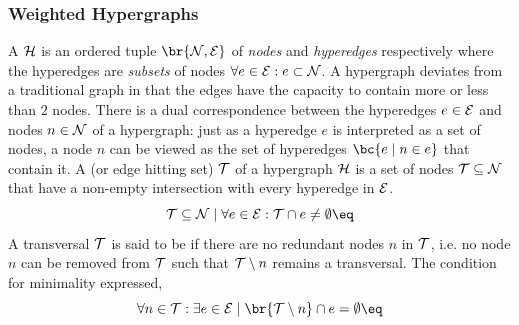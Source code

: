\documentclass[aps, 10pt, english, twoside, pra, nofootinbib, longbibliography]{revtex4-1}
\begin{document}


    \subsubsection{Weighted Hypergraphs}
    A  $\mathcal{H}$ is an ordered tuple $\br{\nodes, \edges}$ of \textit{nodes} and \textit{hyperedges} respectively where the hyperedges are \textit{subsets} of nodes $\forall e \in \mathcal{E} : e \subset \mathcal{N}$. A hypergraph deviates from a traditional graph in that the edges have the capacity to contain more or less than $2$ nodes. There is a dual correspondence between the hyperedges $e \in \mathcal{E}$ and nodes $n \in \mathcal{N}$ of a hypergraph: just as a hyperedge $e$ is interpreted as a set of nodes, a node $n$ can be viewed as the set of hyperedges $\bc{e \mid n \in e}$ that contain it. A  (or edge hitting set) $\mathcal{T}$ of a hypergraph $\mathcal{H}$ is a set of nodes $\mathcal{T} \subseteq \mathcal{N}$ that have a non-empty intersection with every hyperedge in $\mathcal{E}$.
    \[ \trans \subseteq \nodes \mid \forall e \in \edges : \trans \cap e \neq \emptyset \eq \label{eq:flat_trans_def}\]
    A transversal $\mathcal{T}$ is said to be  if there are no redundant nodes $n$ in $\mathcal{T}$, i.e. no node $n$ can be removed from $\mathcal{T}$ such that $\mathcal{T} \setminus n$ remains a transversal. The condition for minimality expressed,
    \[ \forall n \in \trans : \exists e \in \edges \mid \br{\trans \setminus n} \cap e = \emptyset \eq \label{eq:flat_trans_minimal}\]
\end{document}
